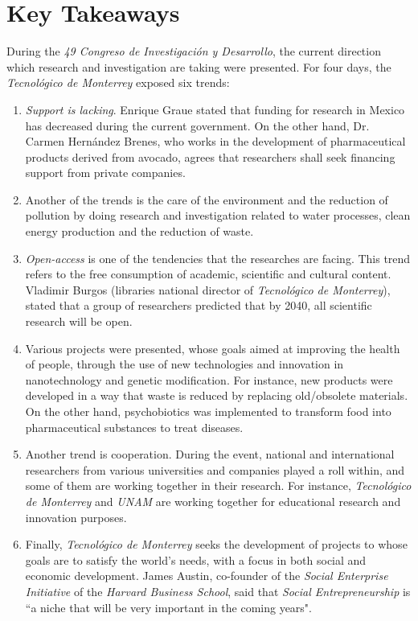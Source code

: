 \documentclass[11pt,a4paper]{article}
\begin{document}
\clearpage

\section{Key Takeaways}\label{sec:takeaways}
During the \emph{49 Congreso de Investigación y Desarrollo}, the current direction which research and investigation are taking were presented. For four days, the \emph{Tecnológico de Monterrey} exposed six trends:

\begin{enumerate}
	\item{
		\emph{Support is lacking}. Enrique Graue stated that funding for research in Mexico has decreased during the current government. On the other hand, Dr. Carmen Hernández Brenes, who works in the development of pharmaceutical products derived from avocado, agrees that researchers shall seek financing support from private companies.
	}
	\item{
		Another of the trends is the care of the environment and the reduction of pollution by doing research and investigation related to water processes, clean energy production and the reduction of waste.
	}
	\item{
		\emph{Open-access} is one of the tendencies that the researches are facing. This trend refers to the free consumption of academic, scientific and cultural content. Vladimir Burgos (libraries national director of \emph{Tecnológico de Monterrey}), stated that a group of researchers predicted that by 2040, all scientific research will be open.
	}
	\item{
		Various projects were presented, whose goals aimed at improving the health of people, through the use of new technologies and innovation in nanotechnology and genetic modification. For instance, new products were developed in a way that waste is reduced by replacing old/obsolete materials. On the other hand, psychobiotics was implemented to transform food into pharmaceutical substances to treat diseases.
	}
	\item{
		Another trend is cooperation. During the event, national and international researchers from various universities and companies played a roll within, and some of them are working together in their research. For instance, \emph{Tecnológico de Monterrey} and \emph{UNAM} are working together for educational research and innovation purposes.
	}
	\item{
		Finally, \emph{Tecnológico de Monterrey} seeks the development of projects to whose goals are to satisfy the world's needs, with a focus in both social and economic development. James Austin, co-founder of the \emph{Social Enterprise Initiative} of the \emph{Harvard Business School}, said that \emph{Social Entrepreneurship} is ``a niche that will be very important in the coming years".
	}
\end{enumerate}
\end{document}
